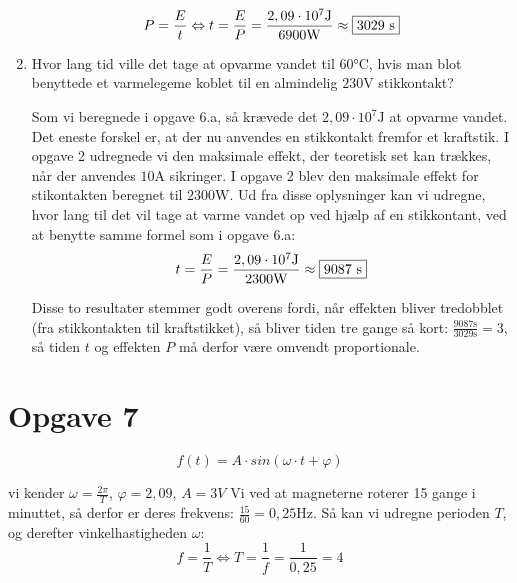 \documentclass[a4paper, 12pt]{article}
\begin{document}
\begin{enumerate}[\textbf{a.}]
	      \begin{equation*}
	      	P=\frac{E}{t} \Leftrightarrow  t=\frac{E}{P}= \frac{2,09 \cdot 10^{7} \si{\joule}}{6900 \si{\watt}} \approx \framebox{3029 \si{\second}}
	      \end{equation*}
	\item Hvor lang tid ville det tage at opvarme vandet til \(60 \si{\celsius}\), hvis man blot benyttede et varmelegeme koblet til en almindelig \(230 \si{\volt}\) stikkontakt? \newline
	      
	      Som vi beregnede i opgave 6.a, så krævede det \(2,09 \cdot 10^{7} \si{\joule}\) at opvarme vandet. Det eneste forskel er, at der nu anvendes en stikkontakt fremfor et kraftstik. I opgave 2 udregnede vi den maksimale effekt, der teoretisk set kan trækkes, når der anvendes \(10 \si{\ampere}\) sikringer. I opgave 2 blev den maksimale effekt for stikontakten beregnet til \(2300 \si{\watt}\). Ud fra disse oplysninger kan vi udregne, hvor lang til det vil tage at varme vandet op ved hjælp af en stikkontant, ved at benytte samme formel som i opgave 6.a:
	      \begin{equation*}
	      	t=\frac{E}{P}=\frac{2,09 \cdot 10^{7} \si{\joule}}{2300 \si{\watt}} \approx \framebox{9087 \si{\second}}
	      \end{equation*}
	      
	      Disse to resultater stemmer godt overens fordi, når effekten bliver tredobblet (fra stikkontakten til kraftstikket), så bliver tiden tre gange så kort: \(\frac{9087 \si{\second}} {3029 \si{\second}} = 3 \), så tiden \(t\) og effekten \(P\) må derfor være omvendt proportionale.
\end{enumerate}

\section*{Opgave 7}

\begin{equation*}
	f(t)=A \cdot sin(\omega \cdot t + \varphi)
\end{equation*}

vi kender \(\omega = \frac{2\pi}{T}\), \(\varphi = 2,09\), \(A = 3 V\) \newline
Vi ved at magneterne roterer 15 gange i minuttet, så derfor er deres frekvens: \(\frac{15}{60}=0,25 \textrm{Hz}\). Så kan vi udregne perioden \(T\), og derefter vinkelhastigheden \(\omega\):
\begin{equation*}
	f=\frac{1}{T} \Leftrightarrow T=\frac{1}{f}=\frac{1}{0,25}=4
\end{equation*}
\end{document}

